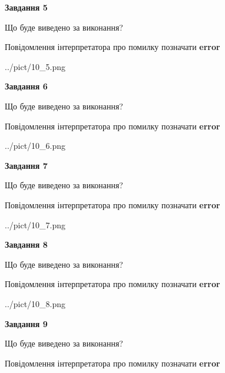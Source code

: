 \documentclass[11pt, ukrainian]{article}
\begin{document}
{\begin {large}
{\begin {center}\textbf{Завдання 5}\end {center}}\par
Що буде виведено за виконання? \par
Повідомлення інтерпретатора про помилку позначати \textbf{error}

\begin{center}
	{../pict/10_5.png}
\end{center}
\newpage

{\begin {center}\textbf{Завдання 6}\end {center}}\par
Що буде виведено за виконання? \par
Повідомлення інтерпретатора про помилку позначати \textbf{error}

\begin{center}
	{../pict/10_6.png}
\end{center}
\newpage

{\begin {center}\textbf{Завдання 7}\end {center}}\par
Що буде виведено за виконання? \par
Повідомлення інтерпретатора про помилку позначати \textbf{error}

\begin{center}
	{../pict/10_7.png}
\end{center}
\newpage

{\begin {center}\textbf{Завдання 8}\end {center}}\par
Що буде виведено за виконання? \par
Повідомлення інтерпретатора про помилку позначати \textbf{error}

\begin{center}
	{../pict/10_8.png}
\end{center}
\newpage

{\begin {center}\textbf{Завдання 9}\end {center}}\par
Що буде виведено за виконання? \par
Повідомлення інтерпретатора про помилку позначати \textbf{error}


\end{large}}
\end{document}
